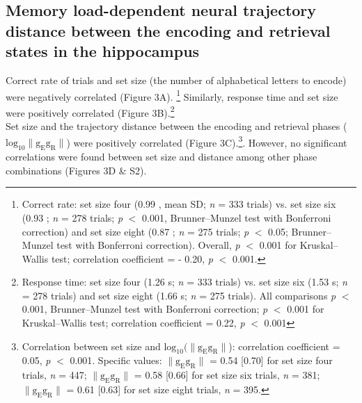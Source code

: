 \subsection{Memory load-dependent neural trajectory distance between the encoding and retrieval states in the hippocampus}
Correct rate of trials and set size (the number of alphabetical letters to encode) were negatively correlated (Figure 3A). \footnote{Correct rate: set size four (0.99 , mean \textpm SD; \textit{n} = 333 trials) vs. set size six (0.93 ; \textit{n} = 278 trials; \textit{p} $<$ 0.001, Brunner--Munzel test with Bonferroni correction) and set size eight (0.87 ; \textit{n} = 275 trials; \textit{p} $<$ 0.05; Brunner--Munzel test with Bonferroni correction). Overall, \textit{p} $<$ 0.001 for Kruskal--Wallis test; correlation coefficient = - 0.20, \textit{p} $<$ 0.001.} Similarly, response time and set size were positively correlated (Figure 3B).\footnote{Response time: set size four (1.26  s; \textit{n} = 333 trials) vs. set size six (1.53  s; \textit{n} = 278 trials) and set size eight (1.66  s; \textit{n} = 275 trials). All comparisons \textit{p} $<$ 0.001, Brunner--Munzel test with Bonferroni correction; \textit{p} $<$ 0.001 for Kruskal--Wallis test; correlation coefficient = 0.22, \textit{p} $<$ 0.001}
\\
\indent
Set size and the trajectory distance between the encoding and retrieval phases ($\mathrm{log_{10}\lVert g_{E}g_{R} \rVert}$) were positively correlated (Figure 3C).\footnote{Correlation between set size and $\mathrm{log_{10}(\lVert g_{E}g_{R} \rVert}$): correlation coefficient = 0.05, \textit{p} $<$ 0.001. Specific values: $\mathrm{\lVert g_{E}g_{R} \rVert}$ = 0.54 [0.70] for set size four trials, \textit{n} = 447; $\mathrm{\lVert g_{E}g_{R} \rVert}$ = 0.58 [0.66] for set size six trials, \textit{n} = 381; $\mathrm{\lVert g_{E}g_{R} \rVert}$ = 0.61 [0.63] for set size eight trials, \textit{n} = 395.}. However, no significant correlations were found between set size and distance among other phase combinations (Figures 3D \& S2).

